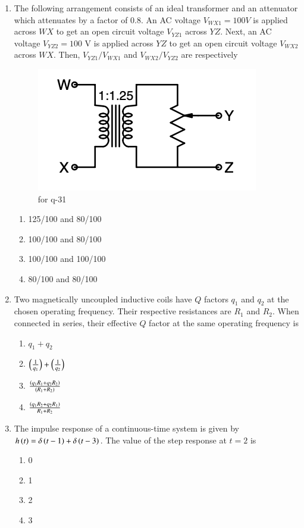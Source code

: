 \documentclass[journal,12pt,onecolumn]{IEEEtran}
\theoremstyle{remark}
\begin{document}
\begin{enumerate}
\item The following arrangement consists of an ideal transformer and an attenuator which attenuates by a factor of 0.8. An AC voltage $V_{WX1} = 100 V$  is applied across $WX$ to get an open circuit voltage $V_{YZ1}$ across $YZ$. Next, an AC voltage $V_{YZ2} = 100$ V is applied across $YZ$ to get an open circuit voltage $V_{WX2}$ across $WX$. Then, $V_{YZ1}/V_{WX1}$ and $V_{WX2}/V_{YZ2}$ are respectively
\begin{figure}[H]
    \centering
    \includegraphics[width=0.5\columnwidth]{figs/fig_10.png}
    \caption{for q-31}
    \label{fig:placeholder_10}
\end{figure}
\begin{multicols}{2}
\begin{enumerate}
\item 125/100 and 80/100
\item 100/100 and 80/100
\item 100/100 and 100/100
\item 80/100 and 80/100
\end{enumerate}
\end{multicols}
\hfill {}

\item Two magnetically uncoupled inductive coils have $Q$ factors $q_1$ and $q_2$ at the chosen operating frequency. Their respective resistances are $R_1$ and $R_2$. When connected in series, their effective $Q$ factor at the same operating frequency is
\begin{multicols}{2}
\begin{enumerate}
\item $q_1 + q_2$
\item $\left(\frac{1}{q_1}\right) + \left(\frac{1}{q_2}\right)$
\item $\frac{\left(q_1 R_1 + q_2 R_2\right)}{\left(R_1 + R_2\right)}$
\item $\frac{\left(q_1 R_2 + q_2 R_1\right)}{R_1 + R_2}$
\end{enumerate}
\end{multicols}
\hfill {}

\item The impulse response of a continuous-time system is given by $h\left(t\right) = \delta\left(t - 1\right) + \delta\left(t - 3\right)$. The value of the step response at $t = 2$ is
\begin{multicols}{4}
\begin{enumerate}
\item 0
\item 1
\item 2
\item 3
\end{enumerate}
\end{multicols}
\hfill {}


\end{enumerate}
\end{document}

